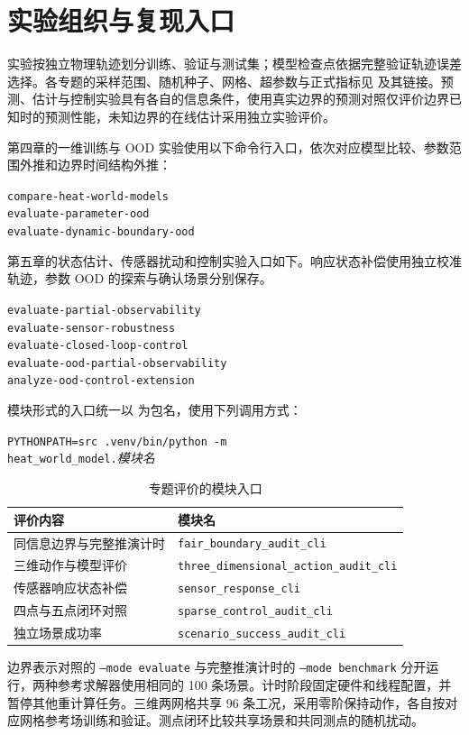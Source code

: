 \documentclass[UTF8,zihao=-4,openany,fontset=mac]{ctexrep}
\begin{document}
\section{实验组织与复现入口}

实验按独立物理轨迹划分训练、验证与测试集；模型检查点依据完整验证轨迹误差选择。各专题的采样范围、随机种子、网格、超参数与正式指标见  及其链接。预测、估计与控制实验具有各自的信息条件，使用真实边界的预测对照仅评价边界已知时的预测性能，未知边界的在线估计采用独立实验评价。

第四章的一维训练与 OOD 实验使用以下命令行入口，依次对应模型比较、参数范围外推和边界时间结构外推：
\begin{center}
  \small\texttt{compare-heat-world-models}\\
  \texttt{evaluate-parameter-ood}\\
  \texttt{evaluate-dynamic-boundary-ood}
\end{center}
第五章的状态估计、传感器扰动和控制实验入口如下。响应状态补偿使用独立校准轨迹，参数 OOD 的探索与确认场景分别保存。
\begin{center}
  \small\texttt{evaluate-partial-observability}\\
  \texttt{evaluate-sensor-robustness}\\
  \texttt{evaluate-closed-loop-control}\\
  \texttt{evaluate-ood-partial-observability}\\
  \texttt{analyze-ood-control-extension}
\end{center}
模块形式的入口统一以  为包名，使用下列调用方式：
\begin{center}
  \small\texttt{PYTHONPATH=src .venv/bin/python -m}\\
  \texttt{heat\_world\_model.}\textit{模块名}
\end{center}
\begin{table}[H]
  \centering
  \small
  \caption{专题评价的模块入口}
  \begin{tabular}{ll}
    \toprule
    评价内容 & 模块名 \\
    \midrule
    同信息边界与完整推演计时 & \texttt{fair\_boundary\_audit\_cli} \\
    三维动作与模型评价 & \texttt{three\_dimensional\_action\_audit\_cli} \\
    传感器响应状态补偿 & \texttt{sensor\_response\_cli} \\
    四点与五点闭环对照 & \texttt{sparse\_control\_audit\_cli} \\
    独立场景成功率 & \texttt{scenario\_success\_audit\_cli} \\
    \bottomrule
  \end{tabular}
\end{table}
边界表示对照的 \texttt{--mode evaluate} 与完整推演计时的 \texttt{--mode benchmark} 分开运行，两种参考求解器使用相同的 100 条场景。计时阶段固定硬件和线程配置，并暂停其他重计算任务。三维两网格共享 96 条工况，采用零阶保持动作，各自按对应网格参考场训练和验证。测点闭环比较共享场景和共同测点的随机扰动。
\end{document}
